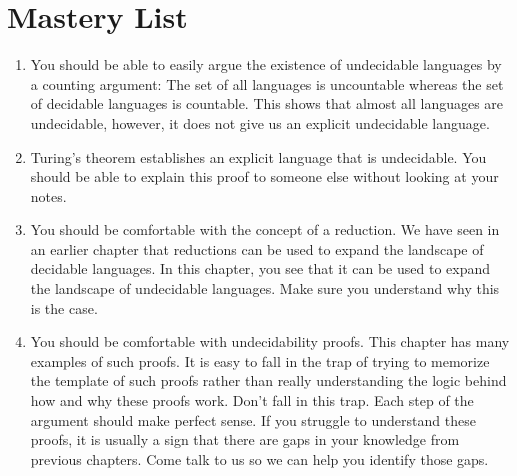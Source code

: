 \section{Mastery List}
\label{sec:Undecidable-Languages::mastery-list}

\begin{gram}
\label{grm:Undecidable-Languages::able}
\begin{enumerate}
    \item You should be able to easily argue the existence of undecidable languages by a counting argument: The set of all languages is uncountable whereas the set of decidable languages is countable. This shows that almost all languages are undecidable, however, it does not give us an explicit undecidable language.
    \item Turing's theorem establishes an explicit language that is undecidable. You should be able to explain this proof to someone else without looking at your notes.
    \item You should be comfortable with the concept of a reduction. We have seen in an earlier chapter that reductions can be used to expand the landscape of decidable languages. In this chapter, you see that it can be used to expand the landscape of undecidable languages. Make sure you understand why this is the case.
    \item You should be comfortable with undecidability proofs. This chapter has many examples of such proofs. It is easy to fall in the trap of trying to memorize the template of such proofs rather than really understanding the logic behind how and why these proofs work. Don't fall in this trap. Each step of the argument should make perfect sense. If you struggle to understand these proofs, it is usually a sign that there are gaps in your knowledge from previous chapters. Come talk to us so we can help you identify those gaps.
\end{enumerate}

\end{gram}

